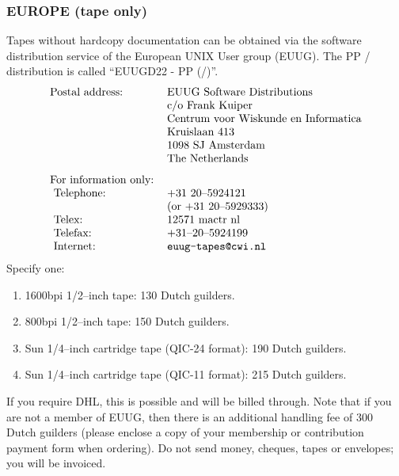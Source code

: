 \subsubsection*{EUROPE (tape only)}
Tapes without hardcopy documentation can be obtained via the software
distribution service of the European UNIX User group (EUUG).
The PP \ppversion/ distribution is called ``EUUGD22 - PP (\ppversion/)''.
\[\begin{tabular}{ll}
Postal address:&        EUUG Software Distributions\\
&                       c/o Frank Kuiper\\
&                       Centrum voor Wiskunde en Informatica\\
&                       Kruislaan 413\\
&                       1098 SJ  Amsterdam\\
&                       The Netherlands\\[0.1in]
For information only:&\\
\ Telephone:&           +31 20--5924121\\
        &               (or +31 20--5929333)\\
\ Telex:&               12571 mactr nl\\
\ Telefax:&             +31--20--5924199\\
\ Internet:&            \verb"euug-tapes@cwi.nl"
\end{tabular}\]
Specify one:
\begin{enumerate}
\item   1600bpi 1/2--inch tape: 130 Dutch guilders.

\item   800bpi 1/2--inch tape: 150 Dutch guilders.

\item   Sun 1/4--inch cartridge tape (QIC-24 format): 190 Dutch guilders.

\item   Sun 1/4--inch cartridge tape (QIC-11 format): 215 Dutch guilders.
\end{enumerate}
If you require DHL, this is possible and will be billed through.
Note that if you are not a member of EUUG,
then there is an additional handling fee of 300 Dutch guilders
(please enclose a copy of your membership or contribution payment form when
ordering).
Do not send money, cheques, tapes or envelopes;
you will be invoiced.


